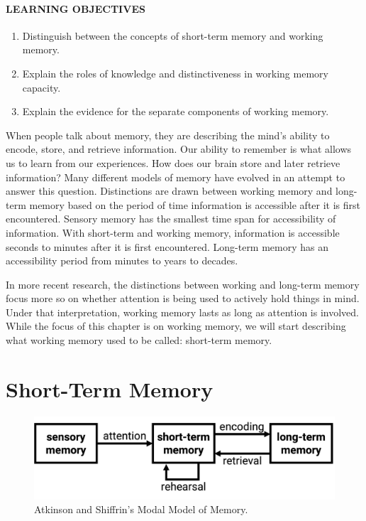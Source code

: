 \documentclass[
]{krantz}
\providecommand{\tightlist}{%
  \setlength{\itemsep}{0pt}\setlength{\parskip}{0pt}}
\begin{document}
\hypertarget{learning-objectives-3}{%
\paragraph*{LEARNING OBJECTIVES}\label{learning-objectives-3}}

\begin{enumerate}
\def\labelenumi{\arabic{enumi}.}
\tightlist
\item
  Distinguish between the concepts of short-term memory and working memory.
\item
  Explain the roles of knowledge and distinctiveness in working memory capacity.
\item
  Explain the evidence for the separate components of working memory.
\end{enumerate}

When people talk about memory, they are describing the mind's ability to encode, store, and retrieve information. Our ability to remember is what allows us to learn from our experiences. How does our brain store and later retrieve information? Many different models of memory have evolved in an attempt to answer this question. Distinctions are drawn between working memory and long-term memory based on the period of time information is accessible after it is first encountered. Sensory memory has the smallest time span for accessibility of information. With short-term and working memory, information is accessible seconds to minutes after it is first encountered. Long-term memory has an accessibility period from minutes to years to decades.

In more recent research, the distinctions between working and long-term memory focus more so on whether attention is being used to actively hold things in mind. Under that interpretation, working memory lasts as long as attention is involved. While the focus of this chapter is on working memory, we will start describing what working memory used to be called: short-term memory.

\hypertarget{short-term-memory}{%
\section{Short-Term Memory}\label{short-term-memory}}

\begin{figure}

{\centering \includegraphics[width=0.6\linewidth]{images/ch4/fig1} 

}

\caption{Atkinson and Shiffrin’s Modal Model of Memory.}\label{fig:modalmodel}
\end{figure}
\end{document}
